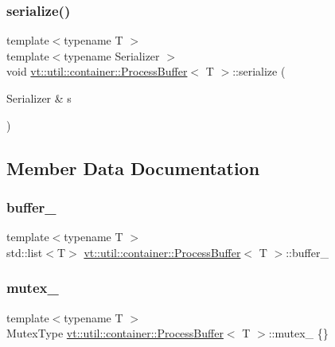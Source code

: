 \subsubsection{\texorpdfstring{serialize()}{serialize()}}
{\footnotesize\ttfamily template$<$typename T $>$ \\
template$<$typename Serializer $>$ \\
void \hyperlink{structvt_1_1util_1_1container_1_1_process_buffer}{vt\+::util\+::container\+::\+Process\+Buffer}$<$ T $>$\+::serialize (\begin{DoxyParamCaption}\item[{Serializer \&}]{s }\end{DoxyParamCaption})\hspace{0.3cm}{\ttfamily [inline]}}



\subsection{Member Data Documentation}
\mbox{\label{structvt_1_1util_1_1container_1_1_process_buffer_a860ed8f4073f16af078cca408ec69a66}} 
\subsubsection{\texorpdfstring{buffer\+\_\+}{buffer\_}}
{\footnotesize\ttfamily template$<$typename T $>$ \\
std\+::list$<$T$>$ \hyperlink{structvt_1_1util_1_1container_1_1_process_buffer}{vt\+::util\+::container\+::\+Process\+Buffer}$<$ T $>$\+::buffer\+\_\+\hspace{0.3cm}{\ttfamily [private]}}

\mbox{\label{structvt_1_1util_1_1container_1_1_process_buffer_a8da1ebe17962ddcccd229f8f75f62fca}} 
\subsubsection{\texorpdfstring{mutex\+\_\+}{mutex\_}}
{\footnotesize\ttfamily template$<$typename T $>$ \\
Mutex\+Type \hyperlink{structvt_1_1util_1_1container_1_1_process_buffer}{vt\+::util\+::container\+::\+Process\+Buffer}$<$ T $>$\+::mutex\+\_\+ \{\}\hspace{0.3cm}{\ttfamily [private]}}

